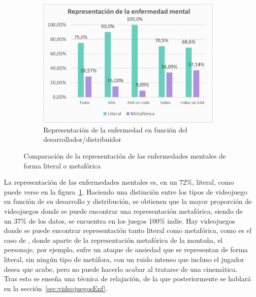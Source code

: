 \documentclass[12pt, a4paper,twoside,titlepage]{book}
\begin{document}
\begin{figure}
\begin{subfigure}{.6\textwidth}
  \includegraphics[width=.95\linewidth]{Graficas estudio/G10; RepmetlitVS.png}
  \caption{Representación de la enfermedad en función del desarrollador/distribuidor}
\end{subfigure}
\caption{Comparación de la representación de las enfermedades mentales de forma literal o metafórica}
\label{fig:ESTrepresentacion}
\end{figure}



La representación de las enfermedades mentales es, en un 72\%, literal, como puede verse en la figura~\ref{fig:ESTrepresentacion}. Haciendo una distinción entre los tipos de videojuego en función de su desarrollo y distribución, se obtienen que la mayor proporción de videojuegos donde se puede encontrar una representación metafórica, siendo de un 37\% de los datos, se encuentra en los juegos 100\% indie. Hay videojuegos donde se puede encontrar representación tanto literal como metafórica, como es el caso de , donde aparte de la representación metafórica de la montaña, el personaje, por ejemplo, sufre un ataque de ansiedad que se representan de forma literal, sin ningún tipo de metáfora, con un ruido intenso que incluso el jugador desea que acabe, pero no puede hacerlo acabar al tratarse de una cinemática. Tras esto se enseña una técnica de relajación, de la que posteriormente se hablará en la sección~\ref{sec:videojuegosEnf}.
\end{document}
